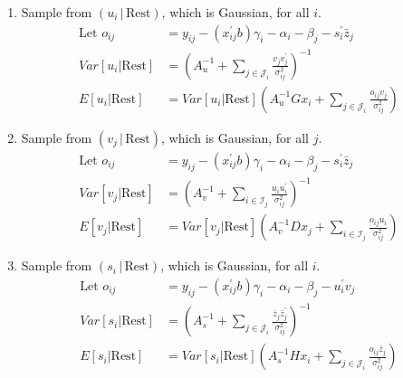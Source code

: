 \begin{enumerate}
\item Sample from $(u_i \,|\, \textrm{Rest})$, which is Gaussian, for all $i$.
\begin{equation}
\begin{split}
\mbox{Let } o_{ij} & =  y_{ij} - (x_{ij}^{\prime} b)\gamma_i - 
						\alpha_i - \beta_j - s_i^\prime \bar{z}_j \\
\textit{Var}[u_i|\mbox{Rest}] & =  
	( A_u^{-1} + 
	  \sum_{j \in \mathcal{J}_i} 
			\frac{v_j v_j^{\prime}}{\sigma_{ij}^{2}} 
	)^{-1} \\
E[u_i|\mbox{Rest}] & = 
	\textit{Var}[u_i|\mbox{Rest}]
	( A_u^{-1} G x_i + 
		 \sum_{j \in \mathcal{J}_i} \frac{o_{ij} v_j}{\sigma_{ij}^{2}} )
\end{split}
\end{equation}

\item Sample from $(v_j \,|\, \textrm{Rest})$, which is Gaussian, for all $j$.
\begin{equation}
\begin{split}
\mbox{Let } o_{ij} & =  y_{ij} - (x_{ij}^{\prime} b)\gamma_i - 
						\alpha_i - \beta_j - s_i^\prime \bar{z}_j \\
\textit{Var}[v_j|\mbox{Rest}] & =  
	( A_v^{-1} + 
	  \sum_{i \in \mathcal{I}_j} 
			\frac{u_i u_i^{\prime}}{\sigma_{ij}^{2}} 
	)^{-1} \\
E[v_j|\mbox{Rest}] & = 
	\textit{Var}[v_j|\mbox{Rest}]
	( A_v^{-1} D x_j + 
		 \sum_{i \in \mathcal{I}_j} \frac{o_{ij} u_i}{\sigma_{ij}^{2}} )
\end{split}
\end{equation}

\item Sample from $(s_i \,|\, \textrm{Rest})$, which is Gaussian, for all $i$.
\begin{equation}
\begin{split}
\mbox{Let } o_{ij} & =  y_{ij} - (x_{ij}^{\prime} b)\gamma_i - 
						\alpha_i - \beta_j - u_i^\prime v_j \\
\textit{Var}[s_i|\mbox{Rest}] & =  
	( A_s^{-1} + 
	  \sum_{j \in \mathcal{J}_i} 
			\frac{\bar{z}_j \bar{z}_j^{\prime}}{\sigma_{ij}^{2}} 
	)^{-1} \\
E[s_i|\mbox{Rest}] & = 
	\textit{Var}[s_i|\mbox{Rest}]
	( A_s^{-1} H x_i + 
		 \sum_{j \in \mathcal{J}_i} \frac{o_{ij} \bar{z}_j}{\sigma_{ij}^{2}} )
\end{split}
\end{equation}


\end{enumerate}
